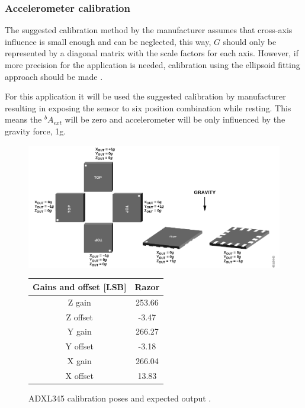 \subsubsection{Accelerometer calibration}\label{subsubsection:adxl345calibration}

The suggested calibration method by the manufacturer \cite{adxl345AN1077}
assumes that cross-axis influence is small enough and can be neglected, this
way, $G$ should only be represented by a diagonal matrix with the scale factors
for each axis. However, if more precision for the application is needed,
calibration using the ellipsoid fitting approach should be made
\cite{Pylvanainen2008}.

For this application it will be used the suggested calibration by manufacturer
resulting in exposing the sensor to six position combination while resting. This
means the ${}^bA_{ext}$ will be zero and accelerometer will be only
influenced by the gravity force, 1g.

\begin{figure}[!hbt]
	\begin{minipage}{0.49\textwidth}
		\centering
		\includegraphics[width=\textwidth]{figures/adxl_calibration.png}
		\caption[ADXL345 calibration poses and expected output.]{ADXL345 calibration
			poses and expected output \cite{adxl345AN1077}.} 
		\label{fig:adxl_calibration}
	\end{minipage}
	\hfill
	\begin{minipage}{0.49\textwidth}
		\renewcommand{\arraystretch}{1.2} %
		\centering
		\begin{tabular}{cc}
			\toprule
			\textbf{Gains and offset [LSB]} & \textbf{Razor }\\
			\midrule
			Z gain   &  253.66  \\
			Z offset & -3.47    \\
			Y gain	 & 266.27    \\
			Y offset & -3.18     \\
			X gain   & 266.04   \\
			X offset & 13.83	\\
			\bottomrule
		\end{tabular}
		\label{tab:adxl_summary}
	\end{minipage}
\end{figure}

